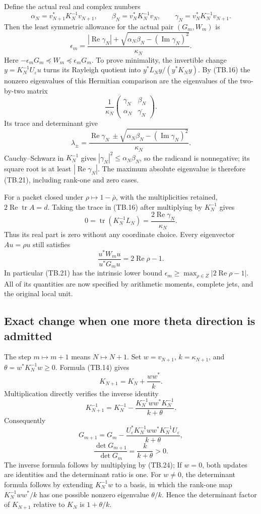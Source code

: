 Define the actual real and complex numbers
\[
 \alpha_N=v_{N+1}^*K_N^{-1}v_{N+1},\qquad
 \beta_N=v_N^*K_N^{-1}v_N,\qquad
 \gamma_N=v_N^*K_N^{-1}v_{N+1}.
 \tag{TB.20}
\]
Then the least symmetric allowance for the actual pair
\((G_m,W_m)\) is
\[
 \boxed{\epsilon_m=
 \frac{|\operatorname{Re}\gamma_N|
  +\sqrt{\alpha_N\beta_N-(\operatorname{Im}\gamma_N)^2}}{\kappa_N}.}
 \tag{TB.21}
\]
Here \(-\epsilon_mG_m\preceq W_m\preceq\epsilon_mG_m\).
To prove minimality, the invertible change \(y=K_N^{-1}U_\varepsilon u\)
turns its Rayleigh quotient into \(y^*L_Ny/(y^*K_Ny)\).
By (TB.16) the nonzero eigenvalues of this Hermitian comparison
are the eigenvalues of the two-by-two matrix
\[
 \frac1{\kappa_N}
 \begin{pmatrix}\gamma_N&\beta_N\\
                 \alpha_N&\overline{\gamma_N}\end{pmatrix}.
\]
Its trace and determinant give
\[
 \lambda_\pm=\frac{\operatorname{Re}\gamma_N
 \ \pm\sqrt{\alpha_N\beta_N-(\operatorname{Im}\gamma_N)^2}}{\kappa_N}.
\]
Cauchy--Schwarz in \(K_N^{-1}\) gives
\(|\gamma_N|^2\leq\alpha_N\beta_N\), so the radicand is
nonnegative; its square root is at least
\(|\operatorname{Re}\gamma_N|\).  The maximum absolute eigenvalue
is therefore (TB.21), including rank-one and zero cases.

For a packet closed under \(\rho\mapsto1-\overline\rho\), with
the multiplicities retained, \(2\operatorname{Re}\operatorname{tr}A=d\).
Taking the trace in (TB.16) after multiplying by \(K_N^{-1}\) gives
\[
 0=\operatorname{tr}(K_N^{-1}L_N)
   =\frac{2\operatorname{Re}\gamma_N}{\kappa_N}.
 \tag{TB.22}
\]
Thus its real part is zero without any coordinate choice.
Every eigenvector \(Au=\rho u\) still satisfies
\[
 \frac{u^*W_mu}{u^*G_mu}=2\operatorname{Re}\rho-1.
 \tag{TB.23}
\]
In particular (TB.21) has the intrinsic lower bound
\(\epsilon_m\geq\max_{\rho\in Z}|2\operatorname{Re}\rho-1|\).
All of its quantities are now specified by arithmetic moments,
complete jets, and the original local unit.

\subsection{Exact change when one more theta direction is admitted}

The step \(m\mapsto m+1\) means \(N\mapsto N+1\).
Set \(w=v_{N+1}\), \(k=\kappa_{N+1}\), and
\(\theta=w^*K_N^{-1}w\geq0\).  Formula (TB.14) gives
\[
 K_{N+1}=K_N+\frac{ww^*}{k}.
 \tag{TB.24}
\]
Multiplication directly verifies the inverse identity
\[
 K_{N+1}^{-1}
 =K_N^{-1}
 -\frac{K_N^{-1}ww^*K_N^{-1}}{k+\theta}.
\]
Consequently
\[
 G_{m+1}=G_m-
 \frac{U_\varepsilon^*K_N^{-1}ww^*K_N^{-1}U_\varepsilon}
      {k+\theta},
 \tag{TB.25}
\]
\[
 \frac{\det G_{m+1}}{\det G_m}=\frac{k}{k+\theta}>0.
 \tag{TB.26}
\]
The inverse formula follows by multiplying by (TB.24);
If \(w=0\), both updates are identities and the determinant
ratio is one.  For \(w\ne0\), the determinant formula follows by
extending \(K_N^{-1}w\)
to a basis, in which the rank-one map
\(K_N^{-1}ww^*/k\) has one possible nonzero eigenvalue
\(\theta/k\).  Hence the determinant factor of \(K_{N+1}\)
relative to \(K_N\) is \(1+\theta/k\).

